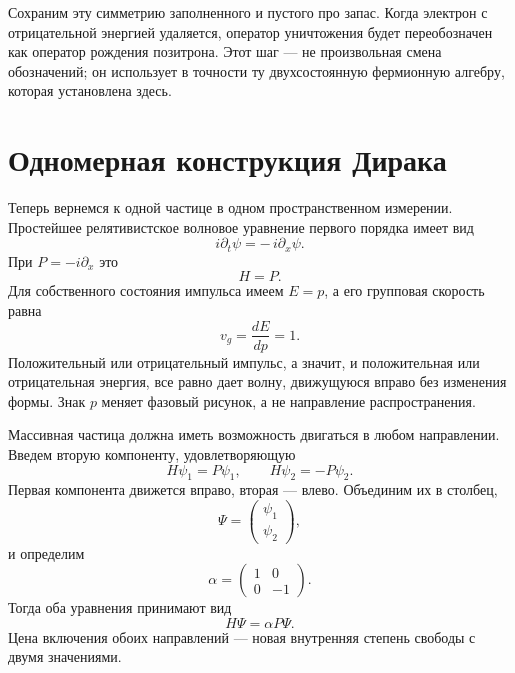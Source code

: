 Сохраним эту симметрию заполненного и пустого про запас. Когда электрон с отрицательной энергией удаляется, оператор уничтожения будет переобозначен как оператор рождения позитрона. Этот шаг — не произвольная смена обозначений; он использует в точности ту двухсостоянную фермионную алгебру, которая установлена здесь.

\section{Одномерная конструкция Дирака}

Теперь вернемся к одной частице в одном пространственном измерении. Простейшее релятивистское волновое уравнение первого порядка имеет вид
\begin{equation}
i\partial_t\psi=-\,i\partial_x\psi.
\label{eq:l10-right-mover}
\end{equation}
При \(P=-i\partial_x\) это
\begin{equation}
H=P.
\end{equation}
Для собственного состояния импульса имеем \(E=p\), а его групповая скорость равна
\begin{equation}
v_g=\frac{dE}{dp}=1.
\end{equation}
Положительный или отрицательный импульс, а значит, и положительная или отрицательная энергия, все равно дает волну, движущуюся вправо без изменения формы. Знак \(p\) меняет фазовый рисунок, а не направление распространения.

Массивная частица должна иметь возможность двигаться в любом направлении. Введем вторую компоненту, удовлетворяющую
\begin{equation}
H\psi_1=P\psi_1,
\qquad
H\psi_2=-P\psi_2.
\label{eq:l10-two-directions}
\end{equation}
Первая компонента движется вправо, вторая — влево. Объединим их в столбец,
\begin{equation}
\Psi=
\begin{pmatrix}
\psi_1\\
\psi_2
\end{pmatrix},
\end{equation}
и определим
\begin{equation}
\alpha=
\begin{pmatrix}
1&0\\
0&-1
\end{pmatrix}.
\end{equation}
Тогда оба уравнения принимают вид
\begin{equation}
H\Psi=\alpha P\Psi.
\label{eq:l10-massless-one-d}
\end{equation}
Цена включения обоих направлений — новая внутренняя степень свободы с двумя значениями.

